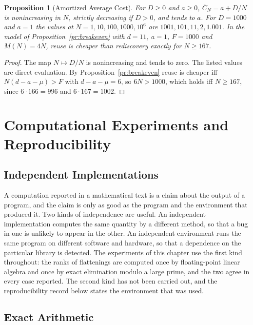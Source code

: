 \documentclass[11pt,letterpaper]{report}
\theoremstyle{plain}
\newtheorem{proposition}[theorem]{Proposition}
\theoremstyle{definition}
\theoremstyle{remark}
\begin{document}
\begin{proposition}[Amortized Average Cost]\label{pr:amortavg}
For $D\ge0$ and $a\ge0$, $\overline C_N=a+D/N$ is nonincreasing in $N$, strictly decreasing if $D>0$, and tends to $a$. For $D=1000$ and $a=1$ the values at $N=1,10,100,1000,10^6$ are $1001,101,11,2,1.001$. In the model of Proposition~\ref{pr:breakeven} with $d=11$, $a=1$, $F=1000$ and $M(N)=4N$, reuse is cheaper than rediscovery exactly for $N\ge167$.
\end{proposition}
\begin{proof}
The map $N\mapsto D/N$ is nonincreasing and tends to zero. The listed values are direct evaluation. By Proposition~\ref{pr:breakeven} reuse is cheaper iff $N(d-a-\mu)>F$ with $d-a-\mu=6$, so $6N>1000$, which holds iff $N\ge167$, since $6\cdot166=996$ and $6\cdot167=1002$.
\end{proof}

\chapter{Computational Experiments and Reproducibility}

\section{Independent Implementations}

A computation reported in a mathematical text is a claim about the output of a program, and the claim is only as good as the program and the environment that produced it. Two kinds of independence are useful. An independent implementation computes the same quantity by a different method, so that a bug in one is unlikely to appear in the other. An independent environment runs the same program on different software and hardware, so that a dependence on the particular library is detected. The experiments of this chapter use the first kind throughout: the ranks of flattenings are computed once by floating-point linear algebra and once by exact elimination modulo a large prime, and the two agree in every case reported. The second kind has not been carried out, and the reproducibility record below states the environment that was used.

\section{Exact Arithmetic}
\end{document}
